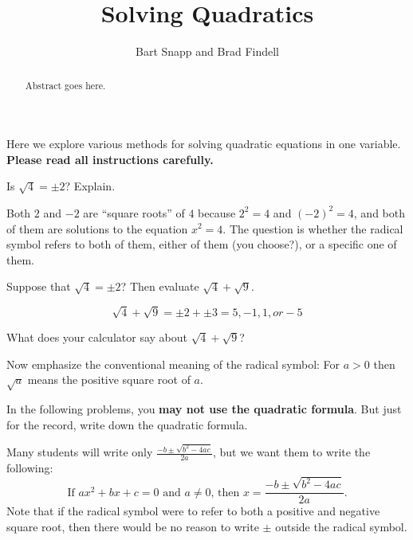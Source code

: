 \documentclass{ximera}
\title{Solving Quadratics}
\author{Bart Snapp and Brad Findell}
\begin{document}
\begin{abstract}
Abstract goes here.  
\end{abstract}
\maketitle

\label{A:solvingQuadratics}
Here we explore various methods for solving quadratic equations in one variable.  \textbf{Please read all instructions carefully.}

\begin{problem}
Is $\sqrt{4}=\pm 2$?  Explain. 
\end{problem}

\vfill

\begin{teachingnote}
Both $2$ and $-2$ are ``square roots'' of $4$ because $2^2=4$ and $(-2)^2=4$, and both of them are solutions to the equation $x^2=4$.  The question is whether the radical symbol refers to both of them, either of them (you choose?), or a specific one of them.  
\end{teachingnote}

\begin{problem}
Suppose that $\sqrt{4}=\pm 2$?  Then evaluate $\sqrt{4}+\sqrt{9}$.  
\end{problem}

\begin{teachingnote}
$$\sqrt{4}+\sqrt{9}=\pm2+\pm3=5, -1, 1, or -5$$
\end{teachingnote}

\vfill

\begin{problem}
What does your calculator say about $\sqrt{4}+\sqrt{9}$?  
\end{problem}

\vfill 

\begin{teachingnote}
Now emphasize the conventional meaning of the radical symbol:  For $a>0$ then $\sqrt{a}$ means the positive square root of $a$.  
\end{teachingnote}



\begin{problem}
In the following problems, you \textbf{may not use the quadratic formula}.  But just for the record, write down the quadratic formula.  
\end{problem}
\begin{teachingnote}
Many students will write only $\frac{-b\pm\sqrt{b^2-4ac}}{2a}$, but we want them to write the following:  
$$\text{If }ax^2+bx+c=0\text{ and }a\ne 0\text{, then }x=\frac{-b\pm\sqrt{b^2-4ac}}{2a}\text{.}$$
Note that if the radical symbol were to refer to both a positive and negative square root, then there would be no reason to write $\pm$ outside the radical symbol.  
\end{teachingnote}
\vspace{0.8in}
\end{document}
